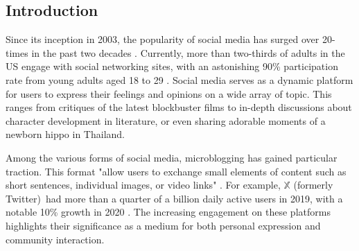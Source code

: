 \documentclass{article}
\newcommand{\twitter}{$\mathbb{X}$ (formerly Twitter)}
\newcommand{\tweets}{tweets}
\begin{document}
\begin{multicols}{2}

\begin{abstract}
Sentimental analysis of social media data, particularly Twitter, has become a popular method for gauging public opinion. This study explores sentiment analysis using the Sentiment140 dataset, focusing on extracting insights from \tweets\ for improving business strategies. We compared traditional machine learning models (Naive Bayes, Logistic Regression) with deep learning models (RNN with LSTM). Data preprocessing involved handling internet slang, text normalization, and lemmatization with part-of-speech tagging to boost accuracy. Logistic Regression reached an F1 score of 0.81, while RNN with LSTM achieved 0.82, showing deep learning's edge in sentiment analysis. However, logistic regression provides fast deployment and computational efficiency, making it ideal for quick to market scenarios. Challenges included handling sarcasm and long training times for some models. Future work aims to implement advanced models like BERT and enhance the preprocessing pipeline.
\end{abstract}

\section{Introduction}

Since its inception in 2003, the popularity of social media has surged over 20-times in the past two decades \cite{kemp2024}. Currently, more than two-thirds of adults in the US engage with social networking sites, with an astonishing 90\% participation rate from young adults aged 18 to 29 \cite{perrin2015}. Social media serves as a dynamic platform for users to express their feelings and opinions on a wide array of topic. This ranges from critiques of the latest blockbuster films to in-depth discussions about character development in literature, or even sharing adorable moments of a newborn hippo in Thailand.

Among the various forms of social media, microblogging has gained particular traction. This format "allow users to exchange small elements of content such as short sentences, individual images, or video links" \cite{kaplan2010}. For example, \twitter\ had more than a quarter of a billion daily active users in 2019, with a notable 10\% growth in 2020 \cite{oberlo2024}. The increasing engagement on these platforms highlights their significance as a medium for both personal expression and community interaction.


\end{multicols}
\end{document}
